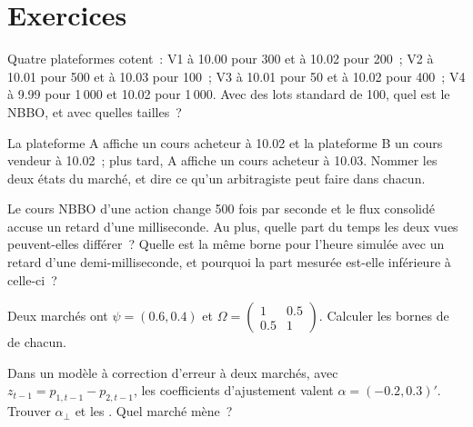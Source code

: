 \section{Exercices}

\begin{exercise}[$\star$]\label{exo:mx:fragmentation-and-routing:1}
Quatre plateformes cotent~: V1 à 10.00 pour 300 et à 10.02 pour 200~; V2 à 10.01 pour 500 et à 10.03 pour 100~; V3 à 10.01 pour 50 et à 10.02 pour 400~; V4 à 9.99 pour 1\,000 et
10.02 pour 1\,000. Avec des lots standard de 100, quel est le NBBO, et avec quelles tailles~?
\end{exercise}

\begin{exercise}[$\star$]\label{exo:mx:fragmentation-and-routing:2}
La plateforme A affiche un cours acheteur à 10.02 et la plateforme B un cours vendeur à 10.02~; plus tard, A affiche un cours acheteur à 10.03. Nommer les deux états du marché, et dire ce qu'un arbitragiste peut faire dans chacun.
\end{exercise}

\begin{exercise}[$\star$]\label{exo:mx:fragmentation-and-routing:3}
Le cours NBBO d'une action change 500 fois par seconde et le flux consolidé accuse un retard d'une milliseconde. Au plus, quelle part du temps les deux vues peuvent-elles
différer~? Quelle est la même borne pour l'heure simulée avec un retard d'une demi-milliseconde, et pourquoi la part mesurée est-elle inférieure à celle-ci~?
\end{exercise}

\begin{exercise}[$\star\star$]\label{exo:mx:fragmentation-and-routing:4}
Deux marchés ont $\psi=(0.6,0.4)$ et $\Omega=\begin{pmatrix}1&0.5\\0.5&1\end{pmatrix}$. Calculer les bornes de  de chacun.
\end{exercise}

\begin{exercise}[$\star\star$]\label{exo:mx:fragmentation-and-routing:5}
Dans un modèle à correction d'erreur à deux marchés, avec $z_{t-1}=p_{1,t-1}-p_{2,t-1}$, les coefficients d'ajustement valent $\alpha=(-0.2,0.3)'$. Trouver $\alpha_\perp$ et les
. Quel marché mène~?
\end{exercise}

